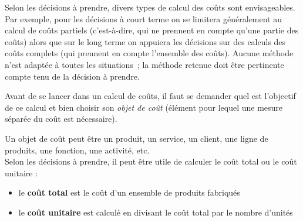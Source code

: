 \documentclass{tufte-handout}
\begin{document}
Selon les décisions à prendre, divers types de calcul des coûts sont envisageables. Par exemple, pour les décisions à court terme on se limitera généralement au calcul de coûts partiels (c'est-à-dire, qui ne prennent en compte qu'une partie des coûts) alors que sur le long terme on appuiera les décisions sur des calculs des coûts complets (qui prennent en compte l'ensemble des coûts). Aucune méthode n'est adaptée à toutes les situations ; la méthode retenue doit être pertinente compte tenu de la décision à prendre.\\
\begin{warning}
Avant de se lancer dans un calcul de coûts, il faut se demander quel est l'objectif de ce calcul et bien choisir son \emph{objet de coût} (élément pour lequel une mesure séparée du coût est nécessaire).\\
\end{warning}
Un objet de coût peut être un produit, un service, un client, une ligne de produits, une fonction, une activité, etc.\\

Selon les décisions à prendre, il peut être utile de calculer le coût total ou le coût unitaire :\\
\begin{itemize}
\item le \textbf{coût total} est le coût d'un ensemble de produits fabriqués\\
\item le \textbf{coût unitaire} est calculé en divisant le coût total par le nombre d'unités\\
\end{itemize}
\end{document}
